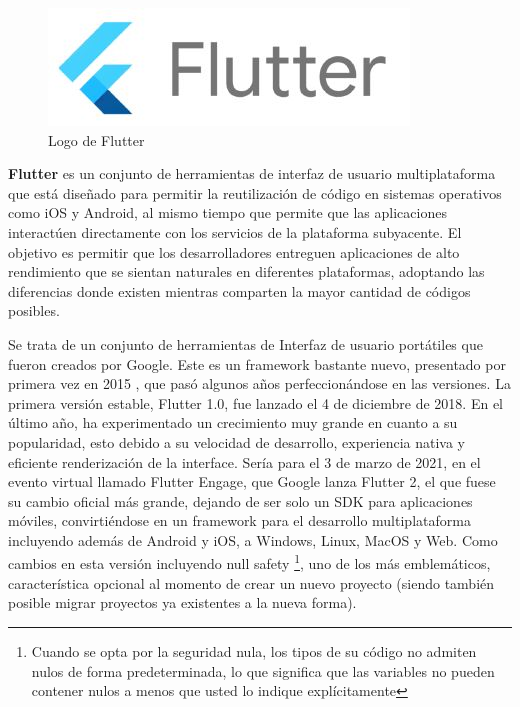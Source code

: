 \begin{figure}[h!]
\begin{center}
\includegraphics[scale=0.5]{Graphics/images/LogodeFlutter.jpg}
\caption{Logo de Flutter}
\label{fig:dh}

\end{center}
\end{figure}


\textbf{Flutter}  es un conjunto de herramientas de interfaz de usuario multiplataforma que está diseñado para permitir la reutilización de código en sistemas operativos como iOS y Android, al mismo tiempo que permite que las aplicaciones interactúen directamente con los servicios de la plataforma subyacente. El objetivo es permitir que los desarrolladores entreguen aplicaciones de alto rendimiento que se sientan naturales en diferentes plataformas, adoptando las diferencias donde existen mientras comparten la mayor cantidad de códigos posibles.

Se trata de un conjunto de herramientas de Interfaz de usuario portátiles que fueron creados por Google. Este es un framework bastante nuevo, presentado por primera vez en 2015 , que pasó algunos años perfeccionándose en las versiones. La primera versión estable, Flutter 1.0, fue lanzado el 4 de diciembre de 2018. En el último año, ha experimentado un crecimiento muy grande en cuanto a su popularidad, esto debido a su velocidad de desarrollo, experiencia nativa y eficiente renderización de la interface. Sería para el 3 de marzo de 2021, en el evento virtual llamado Flutter Engage, que Google lanza Flutter 2, el que fuese su cambio oficial más grande, dejando de ser solo un SDK para aplicaciones móviles, convirtiéndose en un framework para el desarrollo multiplataforma incluyendo además de Android y iOS, a Windows, Linux, MacOS y Web. Como cambios en esta versión incluyendo null safety \footnote{Cuando se opta por la seguridad nula, los tipos de su código no admiten nulos de forma predeterminada, lo que significa que las variables no pueden contener nulos a menos que usted lo indique explícitamente}, uno de los más emblemáticos, característica opcional al momento de crear un nuevo proyecto (siendo también posible migrar proyectos ya existentes a la nueva forma).

